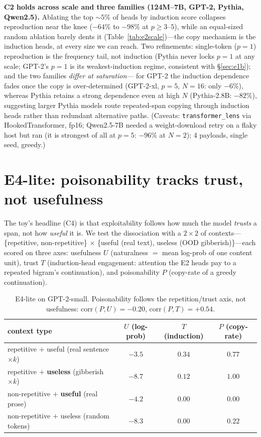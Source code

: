 \documentclass[11pt]{article}
\theoremstyle{plain}
\theoremstyle{definition}
\theoremstyle{remark}
\begin{document}
\textbf{C2 holds across scale and three families (124M--7B, GPT-2, Pythia, Qwen2.5).} Ablating
the top $\sim\!5\%$ of heads by induction score collapses reproduction near the knee ($-64\%$ to
$-98\%$ at $p\ge3$--$5$), while an equal-sized random ablation barely dents it
(Table~\ref{tab:e2scale})---the copy mechanism is the induction heads, at every size we can
reach. Two refinements: single-token ($p{=}1$) reproduction is the frequency tail, not
induction (Pythia never locks $p{=}1$ at any scale; GPT-2's $p{=}1$ is its weakest-induction
regime, consistent with \S\ref{sec:e1b}); and the two families \emph{differ at saturation}---
for GPT-2 the induction dependence fades once the copy is over-determined (GPT-2-xl, $p{=}5$,
$N{=}16$: only $-6\%$), whereas Pythia retains a strong dependence even at high $N$
(Pythia-2.8B: $-82\%$), suggesting larger Pythia models route repeated-span copying through
induction heads rather than redundant alternative paths. (Caveats: \texttt{transformer\_lens}
via HookedTransformer, fp16; Qwen2.5-7B needed a weight-download retry on a flaky host but ran
(it is strongest of all at $p{=}5$: $-96\%$ at $N{=}2$); 4 payloads, single seed, greedy.)

\section{E4-lite: poisonability tracks trust, not usefulness}\label{sec:e4}
The toy's headline (C4) is that exploitability follows how much the model \emph{trusts} a
span, not how \emph{useful} it is. We test the dissociation with a $2\times2$ of contexts---
\{repetitive, non-repetitive\} $\times$ \{useful (real text), useless (OOD gibberish)\}---each
scored on three axes: usefulness $U$ (naturalness $=$ mean log-prob of one content unit),
trust $T$ (induction-head engagement: attention the E2 heads pay to a repeated bigram's
continuation), and poisonability $P$ (copy-rate of a greedy continuation).

\begin{table}[h]
\centering\small
\begin{tabular}{lccc}
\toprule
context type & $U$ (log-prob) & $T$ (induction) & $P$ (copy-rate) \\
\midrule
repetitive $+$ useful (real sentence $\times k$) & $-3.5$ & $0.34$ & $0.77$ \\
repetitive $+$ \textbf{useless} (gibberish $\times k$) & $\mathbf{-8.7}$ & $0.12$ & $\mathbf{1.00}$ \\
non-repetitive $+$ \textbf{useful} (real prose) & $\mathbf{-4.2}$ & $0.00$ & $\mathbf{0.00}$ \\
non-repetitive $+$ useless (random tokens) & $-8.3$ & $0.00$ & $0.22$ \\
\bottomrule
\end{tabular}
\caption{E4-lite on GPT-2-small. Poisonability follows the repetition/trust axis, not
usefulness: $\mathrm{corr}(P,U){=}{-}0.20$, $\mathrm{corr}(P,T){=}{+}0.54$.}
\label{tab:e4}
\end{table}
\end{document}
